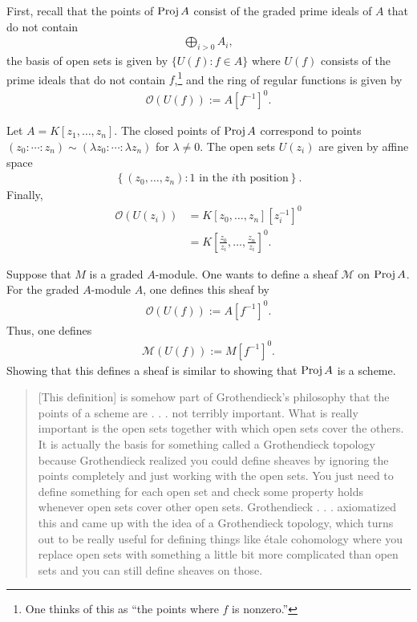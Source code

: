 \documentclass [11 pt, oneside] {article}
\begin{document}
First, recall that the points of $\operatorname{Proj} A$ consist of the graded prime ideals of $A$ that do not contain
\begin{align*}
	\bigoplus_{i>0}A_i,
\end{align*}
the basis of open sets is given by $\{U(f):f\in A\}$ where $U(f)$ consists of the prime ideals that do not contain $f$,\footnote{One thinks of this as ``the points where $f$ is nonzero.''} and the ring of regular functions is given by
\begin{align*}
	\mathscr{O}(U(f)) := A[f^{-1}]^0.
\end{align*}
\begin{example}[ ]\label{}\text{}
Let $A = K[z_1,\hdots,z_n]$. The closed points of $\operatorname{Proj} A$ correspond to points $(z_0:\cdots:z_n)\sim (\lambda z_0:\cdots:\lambda z_n)$ for $\lambda\ne 0$. The open sets $U(z_i)$ are given by affine space
\begin{align*}
	\left\{ (z_0,\hdots,z_n) : \textrm{$1$ in the $i$th position} \right\}. 
\end{align*}
Finally,
\begin{align*}
	\mathscr{O}(U(z_i)) &= K[z_0,\hdots, z_n][z_i^{-1}]^0\\
			    &= K \left[ \frac{z_0}{z_i},\hdots, \frac{z_n}{z_i} \right]^0. 
\end{align*}
\end{example}

Suppose that $M$ is a graded $A$-module. One wants to define a sheaf $\mathscr{M}$ on $\operatorname{Proj} A$. For the graded $A$-module $A$, one defines this sheaf by
\begin{align*}
	\mathscr{O}(U(f)) := A[f^{-1}]^0.
\end{align*}
Thus, one defines
\begin{align*}
	\mathscr{M}(U(f)) := M[f^{-1}]^0.
\end{align*}
Showing that this defines a sheaf is similar to showing that $\operatorname{Proj} A$ is a scheme.
\begin{quote}
	\small [This definition] is somehow part of Grothendieck's philosophy that the points of a scheme are . . . not terribly important. What is really important is the open sets together with which open sets cover the others. It is actually the basis for something called a Grothendieck topology because Grothendieck realized you could define sheaves by ignoring the points completely and just working with the open sets. You just need to define something for each open set and check some property holds whenever open sets cover other open sets. Grothendieck . . . axiomatized this and came up with the idea of a Grothendieck topology, which turns out to be really useful for defining things like \'etale cohomology where you replace open sets with something a little bit more complicated than open sets and you can still define sheaves on those.
\end{quote}
\end{document}
